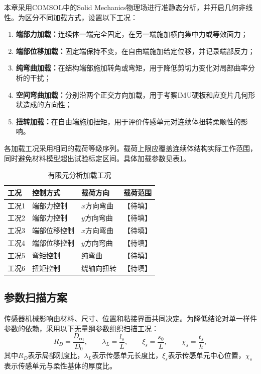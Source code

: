 本章采用COMSOL中的Solid Mechanics物理场进行准静态分析，并开启几何非线性。为区分不同加载方式，设置以下工况：

\begin{enumerate}
    \item \textbf{端部力加载：}连续体一端完全固定，在另一端施加横向集中力或等效面力；
    \item \textbf{端部位移加载：}固定端保持不变，在自由端施加给定位移，并记录端部反力；
    \item \textbf{纯弯曲加载：}在结构端部施加转角或弯矩，用于降低剪切力变化对局部曲率分析的干扰；
    \item \textbf{空间弯曲加载：}分别沿两个正交方向加载，用于考察IMU硬板和应变片几何形状造成的方向性；
    \item \textbf{扭转加载：}在自由端施加扭矩，用于评价传感单元对连续体扭转柔顺性的影响。
\end{enumerate}

各加载工况采用相同的载荷等级序列。载荷上限应覆盖连续体结构实际工作范围，同时避免材料模型超出试验标定区间。具体加载参数见表\ref{tab:loading_conditions}。

\begin{table}[!htbp]
    \centering
    \caption{有限元分析加载工况}
    \label{tab:loading_conditions}
    \begin{tabular}{llll}
        \toprule
        工况 & 控制方式 & 载荷方向 & 载荷范围 \\
        \midrule
        工况1 & 端部力控制 & $x$方向弯曲 & 【待填】 \\
        工况2 & 端部力控制 & $y$方向弯曲 & 【待填】 \\
        工况3 & 端部位移控制 & $x$方向弯曲 & 【待填】 \\
        工况4 & 端部位移控制 & $y$方向弯曲 & 【待填】 \\
        工况5 & 弯矩控制 & 纯弯曲 & 【待填】 \\
        工况6 & 扭矩控制 & 绕轴向扭转 & 【待填】 \\
        \bottomrule
    \end{tabular}
\end{table}


\subsection{参数扫描方案}

传感器机械影响由材料、尺寸、位置和粘接界面共同决定。为降低结论对单一样件参数的依赖，采用以下无量纲参数组织扫描工况：
\begin{equation}
    R_D
    =
    \frac{D_{\mathrm{eq}}}{D_0},
    \qquad
    \lambda_L
    =
    \frac{l_s}{L},
    \qquad
    \xi_s
    =
    \frac{s_0}{L},
    \qquad
    \chi_s
    =
    \frac{t_s}{h},
    \label{eq:dimensionless_sensor_parameters}
\end{equation}
其中$R_D$表示局部刚度比，$\lambda_L$表示传感单元长度比，$\xi_s$表示传感单元中心位置，$\chi_s$表示传感单元与柔性基体的厚度比。

